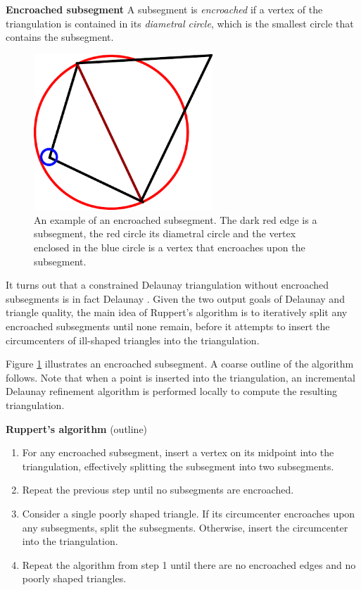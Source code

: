 \documentclass[10pt,a4paper]{article}
\begin{document}
\theoremstyle{definition}
\begin{definition}{\textbf{Encroached subsegment}}
A subsegment is \emph{encroached} if a vertex of the triangulation is contained in its \emph{diametral circle}, which is the smallest circle that contains the subsegment.
\end{definition}

\begin{figure}[htb]
	\centering
    \includegraphics[width=0.6\textwidth]{figures/encroached}
    \caption{An example of an encroached subsegment. The dark red edge is a subsegment, the red circle its diametral circle and the vertex enclosed in the blue circle is a vertex that encroaches upon the subsegment.}
    \label{fig:encroached}
\end{figure}

It turns out that a constrained Delaunay triangulation without encroached subsegments is in fact Delaunay \cite{shewchuk}. Given the two output goals of Delaunay and triangle quality, the main idea of Ruppert's algorithm is to iteratively split any encroached subsegments until none remain, before it attempts to insert the circumcenters of ill-shaped triangles into the triangulation.

Figure \ref{fig:encroached} illustrates an encroached subsegment. A coarse outline of the algorithm follows. Note that when a point is inserted into the triangulation, an incremental Delaunay refinement algorithm is performed locally to compute the resulting triangulation.

\begin{algorithm}{\textbf{Ruppert's algorithm} (outline)}
\begin{enumerate}
	\item For any encroached subsegment, insert a vertex on its midpoint into the 	triangulation, effectively splitting the subsegment into two subsegments.
	\item Repeat the previous step until no subsegments are encroached.
	\item Consider a single poorly shaped triangle. If its circumcenter encroaches upon any subsegments, split the subsegments. Otherwise, insert the circumcenter into the triangulation.
	\item Repeat the algorithm from step 1 until there are no encroached edges and no poorly shaped triangles.
\end{enumerate}
\end{algorithm}
\end{document}
